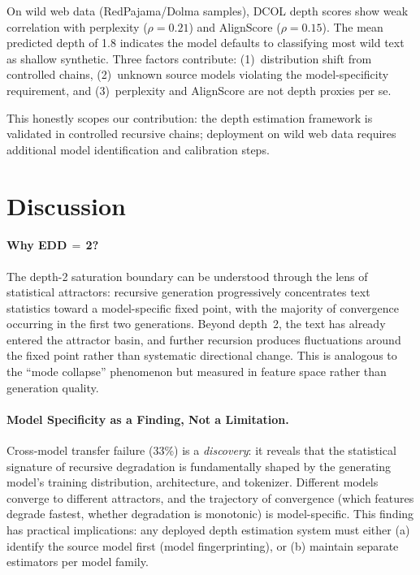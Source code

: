 \documentclass[11pt,a4paper]{article}
\begin{document}
On wild web data (RedPajama/Dolma samples), DCOL depth scores show weak correlation with perplexity ($\rho = 0.21$) and AlignScore ($\rho = 0.15$).
The mean predicted depth of 1.8 indicates the model defaults to classifying most wild text as shallow synthetic.
Three factors contribute: (1)~distribution shift from controlled chains, (2)~unknown source models violating the model-specificity requirement, and (3)~perplexity and AlignScore are not depth proxies per se.

This honestly scopes our contribution: the depth estimation framework is validated in controlled recursive chains; deployment on wild web data requires additional model identification and calibration steps.

\section{Discussion}

\paragraph{Why EDD\,$=$\,2?}
The depth-2 saturation boundary can be understood through the lens of statistical attractors: recursive generation progressively concentrates text statistics toward a model-specific fixed point, with the majority of convergence occurring in the first two generations.
Beyond depth~2, the text has already entered the attractor basin, and further recursion produces fluctuations around the fixed point rather than systematic directional change.
This is analogous to the ``mode collapse'' phenomenon but measured in feature space rather than generation quality.

\paragraph{Model Specificity as a Finding, Not a Limitation.}
Cross-model transfer failure (33\%) is a \emph{discovery}: it reveals that the statistical signature of recursive degradation is fundamentally shaped by the generating model's training distribution, architecture, and tokenizer.
Different models converge to different attractors, and the trajectory of convergence (which features degrade fastest, whether degradation is monotonic) is model-specific.
This finding has practical implications: any deployed depth estimation system must either (a) identify the source model first (model fingerprinting), or (b) maintain separate estimators per model family.
\end{document}
